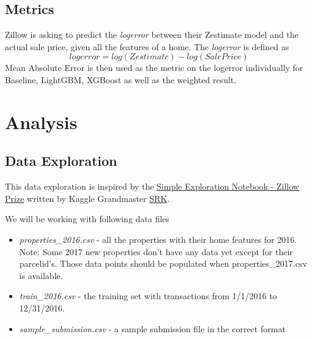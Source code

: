 \documentclass[a4paper]{article}
\begin{document}
\subsection{Metrics}
%
%
Zillow is asking to predict the \textit{logerror} between their Zestimate model and the
actual sale price, given all the features of a home. The \textit{logerror} is defined as
\[ logerror = log(Zestimate) - log(SalePrice) \]
Mean Absolute Error is then used as the metric on the logerror individually for Baseline, LightGBM, XGBoost as well
as the weighted result.


\section{Analysis}

\subsection{Data Exploration}
This data exploration is inspired by the
\href{https://www.kaggle.com/sudalairajkumar/simple-exploration-notebook-zillow-prize}{Simple Exploration Notebook - Zillow Prize}
written by Kaggle Grandmaster \href{https://www.kaggle.com/sudalairajkumar}{SRK}.

We will be working with following data files
\begin{itemize}
    \item \textit{properties\_2016.csv} - all the properties with their home features for 2016. Note: Some 2017 new 
    properties don't have any data yet except for their parcelid's. Those data points should be populated when
    properties\_2017.csv is available.
    \item \textit{train\_2016.csv} - the training set with transactions from 1/1/2016 to 12/31/2016.
    \item \textit{sample\_submission.csv} - a sample submission file in the correct format
\end{itemize}
\end{document}
